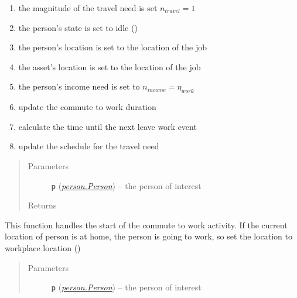 \documentclass[letterpaper,10pt,english]{sphinxmanual}
\begin{document}
\begin{fulllineitems}
\begin{fulllineitems}
\begin{enumerate}
\item {} 
the magnitude of the travel need is set \(n_{travel}=1\)

\item {} 
the person's state is set to idle ()

\item {} 
the person's location is set to the location of the job

\item {} 
the asset's location is set to the location of the job

\item {} 
the person's income need is set to \(n_{income}=\eta_{work}\)

\item {} 
update the commute to work duration

\item {} 
calculate the time until the next leave work event

\item {} 
update the schedule for the travel need

\end{enumerate}
\begin{quote}\begin{description}
\item[{Parameters}] \leavevmode
\textbf{\texttt{p}} ({\hyperref[person:person.Person]{\emph{\emph{person.Person}}}}) -- the person of interest

\item[{Returns}] \leavevmode


\end{description}\end{quote}

\end{fulllineitems}


\begin{fulllineitems}
\label{commute:commute.Commute_To_Work.start}
This function handles the start of the commute to work activity. If the current location of person is         at home, the person is going to work, so set the location to workplace location ()
\begin{quote}\begin{description}
\item[{Parameters}] \leavevmode
\textbf{\texttt{p}} ({\hyperref[person:person.Person]{\emph{\emph{person.Person}}}}) -- the person of interest


\end{description}
\end{quote}
\end{fulllineitems}
\end{fulllineitems}
\end{document}
